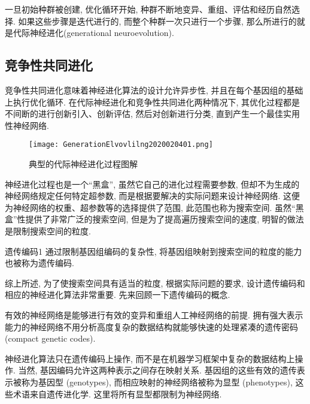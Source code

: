 \begin{remark}
    一旦初始种群被创建, 优化循环开始, 种群不断地变异、重组、评估和经历自然选择.
如果这些步骤是迭代进行的, 而整个种群一次只进行一个步骤, 那么所进行的就是代际神经进化(generational neuroevolution).
\end{remark}
\subsection{竞争性共同进化}
竞争性共同进化意味着神经进化算法的设计允许异步性, 并且在每个基因组的基础上执行优化循环.
在代际神经进化和竞争性共同进化两种情况下, 其优化过程都是不间断的进行创新引入、创新评估, 然后对创新进行分类, 直到产生一个最佳实用性神经网络.
\begin{figure}[H]
    \centering
    \texttt{[image: GenerationElvovlilng2020020401.png]}
    \caption{典型的代际神经进化过程图解}
    \label{GenerationElvovlilng2020020401}
    \vspace{-0.4cm}
\end{figure}

\begin{remark}
神经进化过程也是一个“黑盒”, 虽然它自己的进化过程需要参数, 但却不为生成的神经网络规定任何特定超参数, 而是根据要解决的实际问题来设计神经网络.
这便为神经网络的权重、超参数等的选择提供了范围, 此范围也称为搜索空间.
虽然“黑盒”性提供了非常广泛的搜索空间, 但是为了提高遍历搜索空间的速度, 明智的做法是限制搜索空间的粒度.
\end{remark}

\begin{mydef}{遗传编码}{1}
    通过限制基因组编码的复杂性, 将基因组映射到搜索空间的粒度的能力也被称为遗传编码.
\end{mydef}

\begin{remark}
    综上所述, 为了使搜索空间具有适当的粒度, 根据实际问题的要求, 设计遗传编码和相应的神经进化算法非常重要. 先来回顾一下遗传编码的概念.
\end{remark}

有效的神经网络是能够进行有效的变异和重组人工神经网络的前提.
拥有强大表示能力的神经网络不用分析高度复杂的数据结构就能够快速的处理紧凑的遗传密码 (compact genetic codes).
\begin{remark}
神经进化算法只在遗传编码上操作, 而不是在机器学习框架中复杂的数据结构上操作.
当然, 基因编码允许这两种表示之间存在映射关系.
基因组的这些有效的遗传表示被称为基因型 (genotypes), 而相应映射的神经网络被称为显型 (phenotypes), 这些术语来自遗传进化学. 这里将所有显型都限制为神经网络.
\end{remark}

